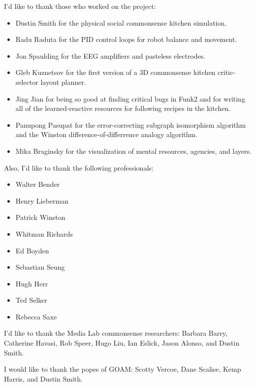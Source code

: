\vspace{5mm}

I'd like to thank those who worked on the project:
\begin{itemize}
\item{Dustin Smith for the physical social commonsense kitchen simulation.}
\item{Radu Raduta for the PID control loops for robot balance and movement.}
\item{Jon Spaulding for the EEG amplifiers and pasteless electrodes.}
\item{Gleb Kuznetsov for the first version of a 3D commonsense kitchen critic-selector layout planner.}
\item{Jing Jian for being so good at finding critical bugs in Funk2 and for writing all of the learned-reactive resources for following recipes in the kitchen.}
\item{Panupong Pasupat for the error-correcting subgraph isomorphism algorithm and the Winston difference-of-differrence analogy algorithm.}
\item{Mika Braginsky for the visualization of mental resources, agencies, and layers.}
\end{itemize}

\vspace{5mm}

Also, I'd like to thank the following professionals:
\begin{itemize}
\item{Walter Bender}
\item{Henry Lieberman}
\item{Patrick Winston}
\item{Whitman Richards}
\item{Ed Boyden}
\item{Sebastian Seung}
\item{Hugh Herr}
\item{Ted Selker}
\item{Rebecca Saxe}
\end{itemize}

\vspace{5mm}

I'd like to thank the Media Lab commonsense researchers:
Barbara Barry,
Catherine Havasi,
Rob Speer,
Hugo Liu,
Ian Eslick,
Jason Alonso, and
Dustin Smith.

I would like to thank the popes of GOAM:
Scotty Vercoe,
Dane Scalise,
Kemp Harris, and
Dustin Smith.

